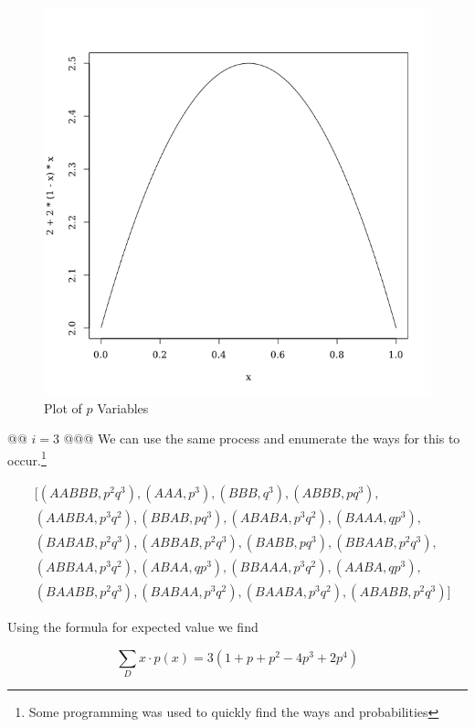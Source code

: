 \documentclass[10pt]{article}
\begin{document}
\begin{easylist}[enumerate]
    \begin{figure}[!ht]
        \centering
        \includegraphics[scale=0.5]{./img/ps5_1.png}
        \caption{Plot of $p$ Variables}
        \label{fig:1.1}
    \end{figure}

    @@ $i = 3$
    @@@ We can use the same process and enumerate the ways for this to occur.\footnote{Some programming was used to
    quickly find the ways and probabilities}

        \[ \begin{aligned}
                &[(AABBB, p^2q^3), (AAA, p^3), (BBB, q^3), (ABBB, pq^3),\\
                &(AABBA, p^3q^2), (BBAB, pq^3), (ABABA, p^3q^2), (BAAA, qp^3),\\
                &(BABAB, p^2q^3), (ABBAB, p^2q^3), (BABB, pq^3), (BBAAB, p^2q^3),\\
                &(ABBAA, p^3q^2), (ABAA, qp^3), (BBAAA, p^3q^2), (AABA, qp^3),\\
                &(BAABB, p^2q^3), (BABAA, p^3q^2), (BAABA, p^3q^2), (ABABB, p^2q^3)]
        \end{aligned} \]

    Using the formula for expected value we find

        \[ \sum_D x \cdot p(x) = 3 (1 + p + p^2 - 4 p^3 + 2 p^4) \]


\end{easylist}
\end{document}
